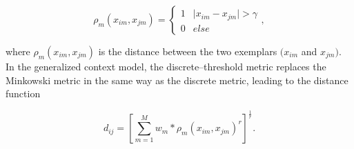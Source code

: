 \documentclass[a4paper,man,natbib]{apa6}
\begin{document}
\begin{equation}
\rho_{m}(x_{im}, x_{jm}) = 
\begin{cases}
	1 & \mid x_{im} - x_{jm} \mid > \gamma \\
	0 & else 
\end{cases},
\end{equation}

where $\rho_{m}(x_{im}, x_{jm})$ is the distance between the two exemplars $(x_{im}$ and $x_{jm})$. In the generalized context model, the discrete--threshold metric replaces the Minkowski metric in the same way as the discrete metric, leading to the distance function

\begin{equation}
d_{ij} = \left[\sum\limits_{m=1}^M w_{m}* \rho_{m}(x_{im}, x_{jm}) ^r\right]^\frac{1}{r}.
\end{equation}



\end{document}
